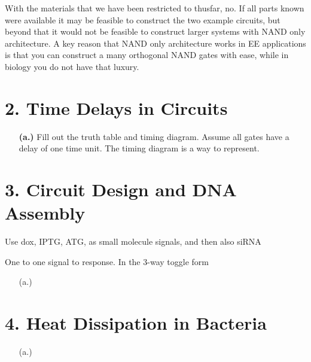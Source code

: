\documentclass[11pt]{article}
\begin{document}
\begin{itemize}
With the materials that we have been restricted to thusfar, no. 
If all parts known were available it may be feasible to construct the two example circuits, but beyond that it would not be feasible to construct larger systems with NAND only architecture.
 A key reason that NAND only architecture works in EE applications is that you can construct a many orthogonal NAND gates with ease, while in biology you do not have that luxury.

\end{itemize}

\section*{2. Time Delays in Circuits}

\begin{itemize}

\item[{\bf (a.)}] Fill out the truth table and timing diagram. Assume all gates have a delay of one time unit. The timing diagram is a way to represent.
 
\end{itemize}


\section*{3. Circuit Design and DNA Assembly}

Use dox, IPTG, ATG, as small molecule signals, and then also siRNA

One to one signal to response. In the 3-way toggle form

\begin{itemize}
\item[(a.)]
\end{itemize}

\section*{4. Heat Dissipation in Bacteria}

\begin{itemize}
\item[(a.)]
\end{itemize}
\end{document}
